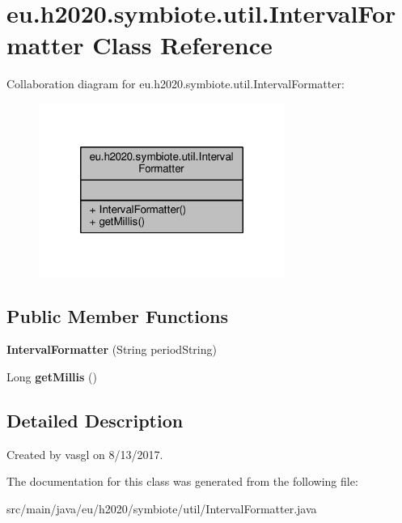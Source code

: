 \hypertarget{classeu_1_1h2020_1_1symbiote_1_1util_1_1IntervalFormatter}{}\section{eu.\+h2020.\+symbiote.\+util.\+Interval\+Formatter Class Reference}
\label{classeu_1_1h2020_1_1symbiote_1_1util_1_1IntervalFormatter}


Collaboration diagram for eu.\+h2020.\+symbiote.\+util.\+Interval\+Formatter\+:\nopagebreak
\begin{figure}[H]
\begin{center}
\leavevmode
\includegraphics[width=228pt]{classeu_1_1h2020_1_1symbiote_1_1util_1_1IntervalFormatter__coll__graph}
\end{center}
\end{figure}
\subsection*{Public Member Functions}
\begin{DoxyCompactItemize}
\item 
\mbox{\label{classeu_1_1h2020_1_1symbiote_1_1util_1_1IntervalFormatter_a4ca7916c117b4d8dafb7f3b7587535f4}} 
{\bfseries Interval\+Formatter} (String period\+String)
\item 
\mbox{\label{classeu_1_1h2020_1_1symbiote_1_1util_1_1IntervalFormatter_abf76c7f7680fa9eb7aed866ef2e04094}} 
Long {\bfseries get\+Millis} ()
\end{DoxyCompactItemize}


\subsection{Detailed Description}
Created by vasgl on 8/13/2017. 

The documentation for this class was generated from the following file\+:\begin{DoxyCompactItemize}
\item 
src/main/java/eu/h2020/symbiote/util/Interval\+Formatter.\+java\end{DoxyCompactItemize}

